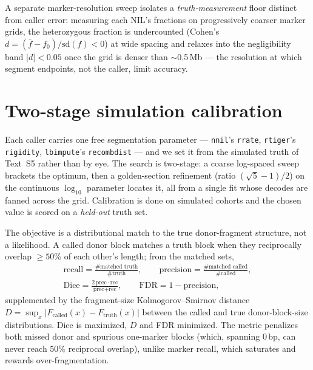 \documentclass[11pt]{article}
\providecommand{\nnil}{\texttt{nnil}\xspace}
\providecommand{\rtiger}{\texttt{rtiger}\xspace}
\providecommand{\lbimpute}{\texttt{lbimpute}\xspace}
\begin{document}
A separate marker-resolution sweep isolates a \emph{truth-measurement} floor distinct
from caller error: measuring each NIL's fractions on progressively coarser marker
grids, the heterozygous fraction is undercounted (Cohen's
$d=(\bar f-f_0)/\mathrm{sd}(f)<0$) at wide spacing and relaxes into the negligibility
band $|d|<0.05$ once the grid is denser than $\sim$0.5\,Mb --- the resolution at
which segment endpoints, not the caller, limit accuracy.

\section{Two-stage simulation calibration}
\label{sec:calibration}

Each caller carries one free segmentation parameter --- \nnil's \texttt{rrate},
\rtiger's \texttt{rigidity}, \lbimpute's \texttt{recombdist} --- and we set it from the
simulated truth of Text~S5 rather than by eye. The search is two-stage: a coarse
log-spaced sweep brackets the optimum, then a golden-section refinement
(ratio $(\sqrt5-1)/2$) on the continuous $\log_{10}$ parameter locates it, all from a
single fit whose decodes are fanned across the grid. Calibration is done on
simulated cohorts and the chosen value is scored on a \emph{held-out} truth set.

The objective is a distributional match to the true donor-fragment structure, not a
likelihood. A called donor block matches a truth block when they reciprocally overlap
$\ge 50\%$ of each other's length; from the matched sets,
\begin{equation}
\begin{gathered}
\text{recall}=\frac{\#\text{matched truth}}{\#\text{truth}},\qquad
\text{precision}=\frac{\#\text{matched called}}{\#\text{called}},\\[2pt]
\mathrm{Dice}=\frac{2\,\text{prec}\cdot\text{rec}}{\text{prec}+\text{rec}},\qquad
\mathrm{FDR}=1-\text{precision},
\end{gathered}
\label{eq:dice}
\end{equation}
supplemented by the fragment-size Kolmogorov--Smirnov distance
$D=\sup_x|F_{\text{called}}(x)-F_{\text{truth}}(x)|$ between the called and true
donor-block-size distributions. Dice is maximized, $D$ and FDR minimized. The metric
penalizes both missed donor and spurious one-marker blocks (which, spanning $0$\,bp,
can never reach $50\%$ reciprocal overlap), unlike marker recall, which saturates and
rewards over-fragmentation.
\end{document}
